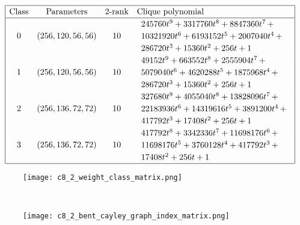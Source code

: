\documentclass[12pt,a4paper]{article}
\begin{document}
\begin{table}[!bhpt] %
\small{}
\begin{align*}
\def\arraystretch{1.2}
\begin{array}{|cccl|}
\hline
\text{Class} &
\text{Parameters} &
\text{2-rank} &
\text{Clique polynomial}
\\
\hline
0 &
(256, 120, 56, 56) &
10 &
\begin{array}{l}
245760t^{9} + 3317760t^{8} + 8847360t^{7}
\,+
\\
 10321920t^{6} + 6193152t^{5} + 2007040t^{4}
\,+
\\
 286720t^{3} + 15360t^{2} + 256t + 1
\end{array}
\\
1 &
(256, 120, 56, 56) &
10 &
\begin{array}{l}
49152t^{9} + 663552t^{8} + 2555904t^{7}
\,+
\\
 5079040t^{6} + 4620288t^{5} + 1875968t^{4}
\,+
\\
 286720t^{3} + 15360t^{2} + 256t + 1
\end{array}
\\
2 &
(256, 136, 72, 72) &
10 &
\begin{array}{l}
327680t^{9} + 4055040t^{8} + 13828096t^{7}
\,+
\\
 22183936t^{6} + 14319616t^{5} + 3891200t^{4}
\,+
\\
 417792t^{3} + 17408t^{2} + 256t + 1
\end{array}
\\
3 &
(256, 136, 72, 72) &
10 &
\begin{array}{l}
417792t^{8} + 3342336t^{7} + 11698176t^{6}
\,+
\\
 11698176t^{5} + 3760128t^{4} + 417792t^{3}
\,+
\\
 17408t^{2} + 256t + 1
\end{array}
\\
\hline
\end{array}
\end{align*}
\caption{$[f_{8,2}]$ extended Cayley classes.}
\label{tab-c8_2_EC_classes}
\end{table}

\begin{figure}[!bhpt] %
\centering
\begin{minipage}{.48\textwidth}
  \centering
  \texttt{[image: c8\_2\_weight\_class\_matrix.png]}
  \label{fig:c8_2_weight_class_matrix}
\end{minipage}%
~~~~
\begin{minipage}{.48\textwidth}
  \centering
  \texttt{[image: c8\_2\_bent\_cayley\_graph\_index\_matrix.png]}
  \label{fig:c8_2_bent_cayley_graph_index_matrix}
\end{minipage}
\end{figure}
~
%
\end{document}
